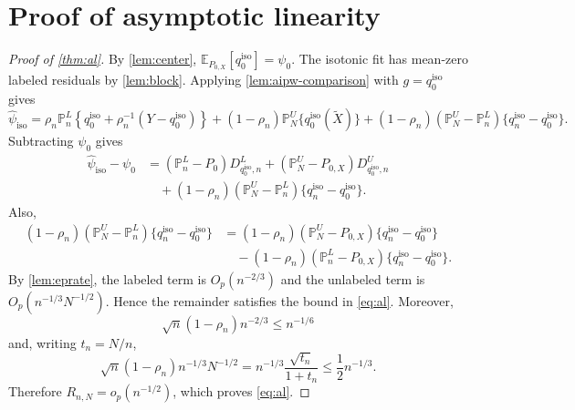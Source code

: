 \documentclass{article}
\theoremstyle{plain}
\theoremstyle{definition}
\newcommand{\E}{\mathbb{E}}
\newcommand{\1}{\mathbf{1}}
\newcommand{\rhon}{\rho_n}
\newcommand{\Pl}{\mathbb{P}^{L}_n}
\newcommand{\Pu}{\mathbb{P}^{U}_N}
\newcommand{\Px}{P_{0,X}}
\begin{document}
\section{Proof of asymptotic linearity}
\label{app:al}

\begin{proof}[Proof of \cref{thm:al}]

By \cref{lem:center}, \(\E_{\Px}[q_0^{\mathrm{iso}}]=\psi_0\). The isotonic fit has mean-zero labeled residuals by \cref{lem:block}. Applying \cref{lem:aipw-comparison} with \(g=q_0^{\mathrm{iso}}\) gives
\[
\widehat{\psi}_{\mathrm{iso}}
=
\rhon \Pl\left\{q_0^{\mathrm{iso}}+\rhon^{-1}(Y-q_0^{\mathrm{iso}})\right\}
+
(1-\rhon)\Pu\{q_0^{\mathrm{iso}}(\widetilde X)\}
+
(1-\rhon)(\Pu-\Pl)\{q_n^{\mathrm{iso}}-q_0^{\mathrm{iso}}\}.
\]
Subtracting \(\psi_0\) gives
\[
\begin{aligned}
\widehat{\psi}_{\mathrm{iso}}-\psi_0
&=
(\Pl-P_0)D_{q_0^{\mathrm{iso}},n}^L
+
(\Pu-\Px)D_{q_0^{\mathrm{iso}},n}^U\\
&\quad +
(1-\rhon)(\Pu-\Pl)\{q_n^{\mathrm{iso}}-q_0^{\mathrm{iso}}\}.
\end{aligned}
\]
Also,
\[
\begin{aligned}
(1-\rhon)(\Pu-\Pl)\{q_n^{\mathrm{iso}}-q_0^{\mathrm{iso}}\}
&=(1-\rhon)(\Pu-\Px)\{q_n^{\mathrm{iso}}-q_0^{\mathrm{iso}}\}\\
&\quad -(1-\rhon)(\Pl-\Px)\{q_n^{\mathrm{iso}}-q_0^{\mathrm{iso}}\}.
\end{aligned}
\]
By \cref{lem:eprate}, the labeled term is \(O_p(n^{-2/3})\) and the unlabeled term is \(O_p(n^{-1/3}N^{-1/2})\). Hence the remainder satisfies the bound in \cref{eq:al}. Moreover,
\[
\sqrt n(1-\rhon)n^{-2/3}\le n^{-1/6}
\]
and, writing \(t_n=N/n\),
\[
\sqrt n(1-\rhon)n^{-1/3}N^{-1/2}
=
n^{-1/3}\frac{\sqrt{t_n}}{1+t_n}
\le \frac12n^{-1/3}.
\]
Therefore \(R_{n,N}=o_p(n^{-1/2})\), which proves \cref{eq:al}.
\end{proof}
\end{document}
